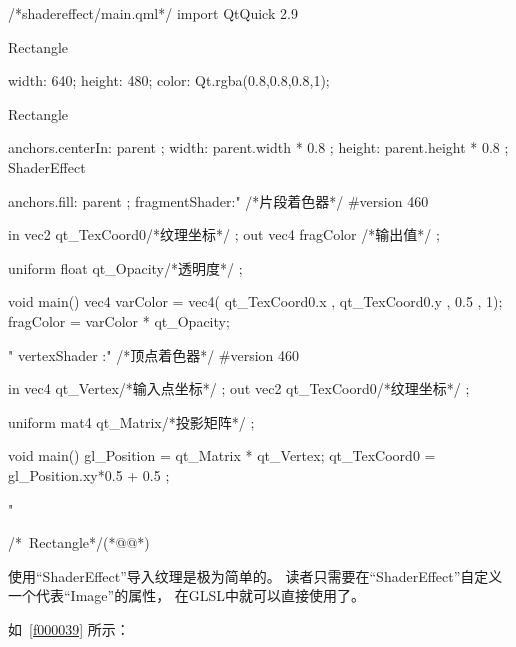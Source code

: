 {}\label{f000038}    %
\begin{thebookfilesourceone}[escapeinside={(*@}{@*)},
caption=GoodLuck,
title=\filesourcenumbernameone \thefilesourcenumber
]
/*shadereffect/main.qml*/
import QtQuick 2.9

Rectangle {

    width: 640;
    height: 480;
    color: Qt.rgba(0.8,0.8,0.8,1);

    Rectangle{
        anchors.centerIn: parent    ;
        width: parent.width * 0.8   ;
        height: parent.height * 0.8 ;
        ShaderEffect{
            anchors.fill: parent ;
            fragmentShader:"
/*片段着色器*/
#version 460

in vec2  qt_TexCoord0/*纹理坐标*/  ;
out vec4 fragColor   /*输出值*/    ;

uniform float qt_Opacity/*透明度*/ ;

void main() {
    vec4 varColor  = vec4( qt_TexCoord0.x ,  qt_TexCoord0.y , 0.5 , 1);
    fragColor = varColor * qt_Opacity;
}

"
            vertexShader :"
/*顶点着色器*/
#version 460

in vec4 qt_Vertex/*输入点坐标*/    ;
out vec2 qt_TexCoord0/*纹理坐标*/  ;

uniform mat4 qt_Matrix/*投影矩阵*/ ;

void main() {
    gl_Position = qt_Matrix * qt_Vertex;
    qt_TexCoord0 = gl_Position.xy*0.5 + 0.5 ;
}

"
        }
    }

}/*~Rectangle*/(*@\marginpar[\hfill\setlength\fboxsep{2pt}\fbox{\footnotesize{\kaishu\parbox{1em}{\setlength{\baselineskip}{2pt}\filesourcenumbernameone}}\footnotesize{\thefilesourcenumber}}]{\setlength\fboxsep{2pt}\fbox{\footnotesize{\kaishu\parbox{1em}{\setlength{\baselineskip}{2pt}\filesourcenumbernameone}}\footnotesize{\thefilesourcenumber}}}@*)\end{thebookfilesourceone}          %
\addtocounter{lstlisting}{-1}   %


使用“ShaderEffect”导入纹理是极为简单的。
读者只需要在“ShaderEffect”自定义
一个代表“Image”的属性，
在GLSL中就可以直接使用了。

如\filesourcenumbernameone\ \ref{f000039}
所示：

